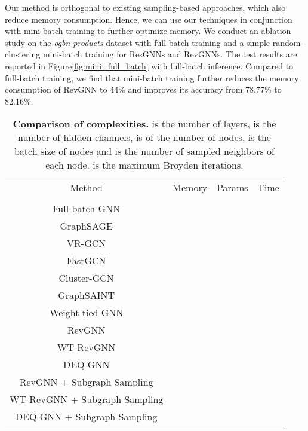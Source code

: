 \documentclass{article}
\newcommand{\figLabel}{Figure\xspace}
\begin{document}
Our method is orthogonal to existing sampling-based approaches, which also reduce memory consumption. Hence, we can use our techniques in conjunction with mini-batch training to further optimize memory.
We conduct an ablation study on the \emph{ogbn-products} dataset \citep{hu2020open} with full-batch training and a simple random-clustering mini-batch training for ResGNNs and RevGNNs. The test results are reported in \figLabel \ref{fig:mini_full_batch} with full-batch inference. Compared to full-batch training, we find that mini-batch training further reduces the memory consumption of RevGNN to 44\% and improves its accuracy from 78.77\% to 82.16\%.

\begin{table*}[ht]
\vspace{-8pt}
\centering
\setlength{\tabcolsep}{5pt}
\caption{\textbf{Comparison of complexities.}  is the number of layers,  is the number of hidden channels,  is of the number of nodes,  is the batch size of nodes and  is the number of sampled neighbors of each node.  is the maximum Broyden iterations.}
\vspace{2pt}
\begin{tabular}{cccc}
\toprule
  \label{table:cplx}
  \centering
Method & Memory & Params & Time \\\\
\midrule
Full-batch GNN &  &  &  \\
GraphSAGE &  &  & \\
VR-GCN &  &  &  \\
FastGCN &  &  &  \\
Cluster-GCN &  &  &  \\
GraphSAINT &  &  &  \\
Weight-tied GNN &  &  &  \\
\midrule
RevGNN &  &  &  \\
WT-RevGNN &  &  &  \\
DEQ-GNN &  &  &  \\
\midrule
RevGNN + Subgraph Sampling &  &  & \\
WT-RevGNN + Subgraph Sampling &  &  &  \\
DEQ-GNN + Subgraph Sampling &  &  &  \\
\bottomrule
\end{tabular}
\end{table*}
\end{document}
